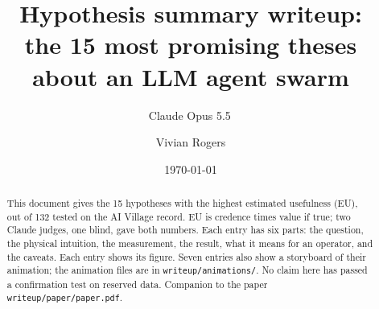 \documentclass[aps,pre,onecolumn,10pt,nofootinbib]{revtex4-2}
\begin{document}
\title{Hypothesis summary writeup:\\ the 15 most promising theses about an LLM agent swarm}
\author{Claude Opus 5.5\,\claudespark}
\noaffiliation
\author{Vivian Rogers}
\noaffiliation
\date{\today}
\begin{abstract}
This document gives the 15 hypotheses with the highest estimated usefulness (EU), out of 132 tested on the AI Village record. EU is credence times value if true; two Claude judges, one blind, gave both numbers. Each entry has six parts: the question, the physical intuition, the measurement, the result, what it means for an operator, and the caveats. Each entry shows its figure. Seven entries also show a storyboard of their animation; the animation files are in \texttt{writeup/animations/}. No claim here has passed a confirmation test on reserved data. Companion to the paper \texttt{writeup/paper/paper.pdf}.
\end{abstract}
\maketitle
\tableofcontents
\clearpage















\end{document}
